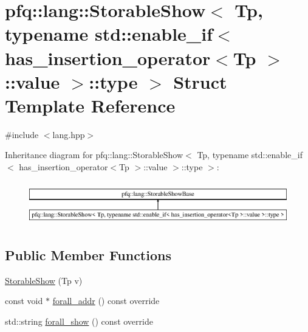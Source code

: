 \hypertarget{structpfq_1_1lang_1_1StorableShow_3_01Tp_00_01typename_01std_1_1enable__if_3_01has__insertion__od122cff4f7f007817c88f5b20f967bec}{\section{pfq\+:\+:lang\+:\+:Storable\+Show$<$ Tp, typename std\+:\+:enable\+\_\+if$<$ has\+\_\+insertion\+\_\+operator$<$Tp $>$\+:\+:value $>$\+:\+:type $>$ Struct Template Reference}
\label{structpfq_1_1lang_1_1StorableShow_3_01Tp_00_01typename_01std_1_1enable__if_3_01has__insertion__od122cff4f7f007817c88f5b20f967bec}
}


{\ttfamily \#include $<$lang.\+hpp$>$}

Inheritance diagram for pfq\+:\+:lang\+:\+:Storable\+Show$<$ Tp, typename std\+:\+:enable\+\_\+if$<$ has\+\_\+insertion\+\_\+operator$<$Tp $>$\+:\+:value $>$\+:\+:type $>$\+:\begin{figure}[H]
\begin{center}
\leavevmode
\includegraphics[height=1.914530cm]{structpfq_1_1lang_1_1StorableShow_3_01Tp_00_01typename_01std_1_1enable__if_3_01has__insertion__od122cff4f7f007817c88f5b20f967bec}
\end{center}
\end{figure}
\subsection*{Public Member Functions}
\begin{DoxyCompactItemize}
\item 
\hyperlink{structpfq_1_1lang_1_1StorableShow_3_01Tp_00_01typename_01std_1_1enable__if_3_01has__insertion__od122cff4f7f007817c88f5b20f967bec_a2e8ecabdf4fbdbde65f96b0483722541}{Storable\+Show} (Tp v)
\item 
const void $\ast$ \hyperlink{structpfq_1_1lang_1_1StorableShow_3_01Tp_00_01typename_01std_1_1enable__if_3_01has__insertion__od122cff4f7f007817c88f5b20f967bec_a7ca1f63697a81ab672a294b9e21f9e96}{forall\+\_\+addr} () const override
\item 
std\+::string \hyperlink{structpfq_1_1lang_1_1StorableShow_3_01Tp_00_01typename_01std_1_1enable__if_3_01has__insertion__od122cff4f7f007817c88f5b20f967bec_a59253ff200a3638e04df6db43c2b6c53}{forall\+\_\+show} () const override
\end{DoxyCompactItemize}
